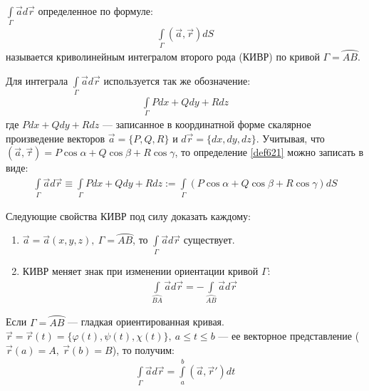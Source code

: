\begin{definition}
  \label{def621}
  $\int\limits_\Gamma \vec a d \vec r$ определенное по формуле:
  \begin{gather}
    \int\limits_\Gamma (\vec a, \vec r) dS
    \label{def621:int1}
  \end{gather}
  называется криволинейным интегралом второго рода (КИВР) по кривой $\Gamma =
  \wideparen{AB}$.
\end{definition}

Для интеграла $\int\limits_\Gamma \vec a d \vec r$ используется так же
обозначение:
\begin{gather*}
  \int\limits_\Gamma Pdx + Qdy + Rdz
\end{gather*}
где $Pdx + Qdy + Rdz$ --- записанное в координатной форме скалярное
произведение векторов $\vec a = \{P, Q, R\}$ и $d \vec r = \{dx, dy, dz\}$.
Учитывая, что $(\vec a, \vec \tau) = P \cos \alpha + Q \cos \beta + R \cos
\gamma$, то определение \eqref{def621} можно записать в виде:
\begin{gather}
  \int\limits_\Gamma \vec a d \vec r \equiv \int\limits_\Gamma Pdx + Qdy + Rdz
  := \int\limits_\Gamma (P\cos \alpha + Q \cos \beta + R \cos \gamma) dS
  \label{def621:int2}
\end{gather}

Следующие свойства КИВР под силу доказать каждому:
\begin{enumerate}
  \item $\vec a = \vec a(x, y, z), \ \Gamma = \wideparen{AB}$, то
    $\int\limits_\Gamma \vec a d \vec r$ существует.
  \item КИВР меняет знак при изменении ориентации кривой $\Gamma$:
    \begin{gather*}
      \int\limits_{\wideparen{BA}} \vec a d \vec r =
      -\int\limits_{\wideparen{AB}} \vec a d \vec r
    \end{gather*}
\end{enumerate}

\begin{theorem}
  Если $\Gamma = \wideparen{AB}$ --- гладкая ориентированная кривая. \\ $\vec r =
  \vec r(t) = \{\varphi(t), \psi(t), \chi(t)\}, \ a \leq t \leq b$ --- ее
  векторное представление ($\vec r(a) = A, \ \vec r(b) = B$), то получим:
  \begin{gather}
    \int\limits_\Gamma \vec a d \vec r = \int\limits_a^b (\vec a, \vec r') dt
    \label{th621:eq1}
  \end{gather}
\end{theorem}

